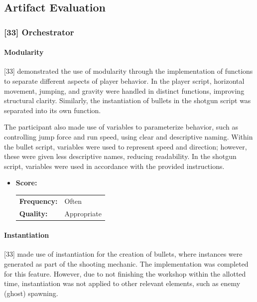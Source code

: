 ﻿\subsection{Artifact Evaluation}\label{subsec:artifact-evaluation}

\subsubsection{[33] Orchestrator}

\paragraph{Modularity}

[33] demonstrated the use of modularity through the implementation of functions to separate different aspects of player behavior.
In the player script, horizontal movement, jumping, and gravity were handled in distinct functions, improving structural clarity.
Similarly, the instantiation of bullets in the shotgun script was separated into its own function.

The participant also made use of variables to parameterize behavior, such as controlling jump force and run speed, using clear and descriptive naming.
Within the bullet script, variables were used to represent speed and direction; however, these were given less descriptive names, reducing readability.
In the shotgun script, variables were used in accordance with the provided instructions.




\begin{itemize}
    \item \textbf{Score:}
    \begin{tabular}{ll}
        \textbf{Frequency:} & Often \\
        \textbf{Quality:}   & Appropriate \\
    \end{tabular}
\end{itemize}

\paragraph{Instantiation}

[33] made use of instantiation for the creation of bullets, where instances were generated as part of the shooting mechanic.
The implementation was completed for this feature.
However, due to not finishing the workshop within the allotted time, instantiation was not applied to other relevant elements, such as enemy (ghost) spawning.


